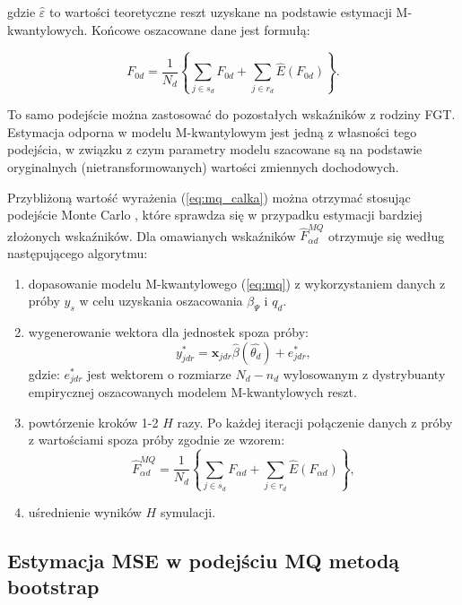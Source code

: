 gdzie $\hat{\varepsilon}$ to wartości teoretyczne reszt uzyskane na podstawie estymacji M-kwantylowych. Końcowe oszacowane dane jest formułą:

\begin{equation}
F_{0d}=\frac{1}{N_d}\left\{\sum\limits_{j \in s_d}{F_{0d}}+\sum\limits_{j \in r_d}{\hat{E}(F_{0d})}\right\}.
\label{eq:mq_fin}
\end{equation}

To samo podejście można zastosować do pozostałych wskaźników z rodziny FGT. Estymacja odporna w modelu M-kwantylowym jest jedną z własności tego podejścia, w związku z czym parametry modelu szacowane są na podstawie oryginalnych (nietransformowanych) wartości zmiennych dochodowych.

Przybliżoną wartość wyrażenia (\ref{eq:mq_calka}) można otrzymać stosując podejście Monte Carlo \citep{povsocecl152014}, które sprawdza się w przypadku estymacji bardziej złożonych wskaźników. Dla omawianych wskaźników $\hat{F}_{\alpha d}^{MQ}$ otrzymuje się według następującego algorytmu:

\begin{enumerate}
\item dopasowanie modelu M-kwantylowego (\ref{eq:mq}) z wykorzystaniem danych z próby $y_s$ w celu uzyskania oszacowania $\beta_\Psi$ i $q_d$.
\item wygenerowanie wektora dla jednostek spoza próby:
\begin{equation}
y^{*}_{jdr}=\boldsymbol{x}_{jdr}\hat{\beta}(\hat{\theta_d})+e^{*}_{jdr},
\end{equation}
gdzie: $e^{*}_{jdr}$ jest wektorem o rozmiarze $N_d - n_d$ wylosowanym z dystrybuanty empirycznej oszacowanych modelem M-kwantylowych reszt. 
\item powtórzenie kroków 1-2 $H$ razy. Po każdej iteracji połączenie danych z próby z wartościami spoza próby zgodnie ze wzorem:
\begin{equation}
\hat{F}_{\alpha d}^{MQ}=\frac{1}{N_d}\left\{\sum\limits_{j \in s_d}{F_{\alpha d}}+\sum\limits_{j \in r_d}{\hat{E}(F_{\alpha d})}\right\},
\end{equation}
\item uśrednienie wyników $H$ symulacji.
\end{enumerate}

\subsection{Estymacja MSE w podejściu MQ metodą bootstrap}

